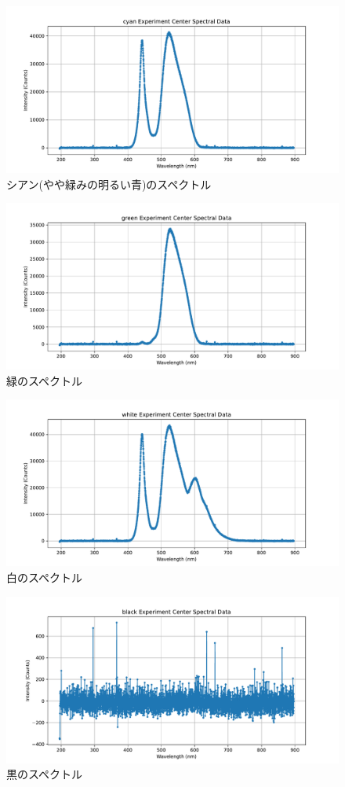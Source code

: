 \documentclass[a4j,twocolumn]{jsarticle}
\begin{document}
\begin{figure}[htb]
    \centering
    \includegraphics[keepaspectratio,width=0.6\columnwidth]{fig/cyan.pdf}
    \caption{シアン(やや緑みの明るい青)のスペクトル}
\end{figure}
\begin{figure}[htb]
    \centering
    \includegraphics[keepaspectratio,width=0.6\columnwidth]{fig/green.pdf}
    \caption{緑のスペクトル}
\end{figure}
\begin{figure}[htb]
    \centering
    \includegraphics[keepaspectratio,width=0.6\columnwidth]{fig/white.pdf}
    \caption{白のスペクトル}
\end{figure}
\begin{figure}[htb]
    \centering
    \includegraphics[keepaspectratio,width=0.6\columnwidth]{fig/black.pdf}
    \caption{黒のスペクトル}
\end{figure}
\end{document}
